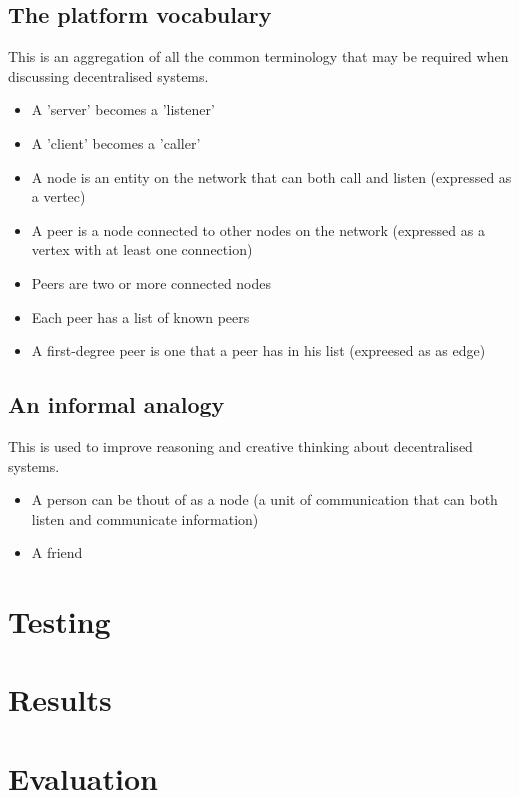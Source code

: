 \documentclass[a4paper]{article}
\begin{document}
    \subsection{The platform vocabulary}
    This is an aggregation of all the common terminology that may be required when discussing decentralised systems.
    \begin{itemize}
        \item A 'server' becomes a 'listener'
        \item A 'client' becomes a 'caller'
        \item A node is an entity on the network that can both call and listen (expressed as a vertec)
        \item A peer is a node connected to other nodes on the network (expressed as a vertex with at least one connection)
        \item Peers are two or more connected nodes
        \item Each peer has a list of known peers
        \item A first-degree peer is one that a peer has in his list (expreesed as as edge)
    \end{itemize}

    \subsection{An informal analogy}
    This is used to improve reasoning and creative thinking about decentralised systems.
    \begin{itemize}
        \item A person can be thout of as a node (a unit of communication that can both listen and communicate information)
        \item A friend
    \end{itemize}

    \section{Testing}
    \section{Results}
    \section{Evaluation}
\end{document}
